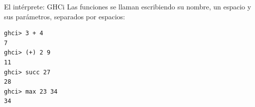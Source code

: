 \begin{frame}[fragile]{El intérprete: GHCi}
 Las funciones se llaman escribiendo su nombre, un espacio y sus parámetros, separados por espacios:
\espacio
  \begin{lstlisting}
ghci> 3 + 4
7
ghci> (+) 2 9
11
ghci> succ 27
28
ghci> max 23 34
34
  \end{lstlisting}

\end{frame}



